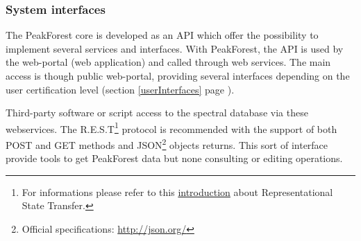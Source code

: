 \subsubsection{System interfaces}

The PeakForest core is developed as an API which offer the possibility to implement several services and interfaces. With PeakForest, the API is used by the web-portal (web application) and called through web services. The main access  is though public web-portal, providing several interfaces depending on the user certification level (\cf section \ref{userInterfaces} page \pageref{userInterfaces}).

Third-party software or script access to the spectral database via these webservices. The R.E.S.T\footnote{For informations please refer to this \href{https://www.ics.uci.edu/~fielding/pubs/dissertation/rest_arch_style.htm}{introduction} about Representational State Transfer.} protocol is recommended with the support of both POST and GET methods and JSON\footnote{Official specifications: \url{http://json.org/}} objects returns. This sort of interface provide tools to get PeakForest data but none consulting or editing operations. 

